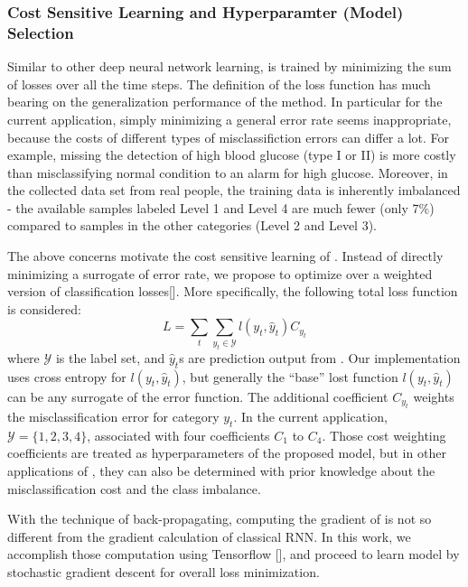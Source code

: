 \subsubsection{Cost Sensitive Learning and Hyperparamter (Model) Selection}
Similar to other deep neural network learning, \modelname is trained by minimizing the sum of losses over all the time steps.
The definition of the loss function has much bearing on the generalization performance of the method.
In particular for the current application, simply minimizing a general error rate seems inappropriate, because the costs of different types of misclassifiction errors can differ a lot.
For example, missing the detection of high blood glucose (type I or II) is more costly than misclassifying normal condition to an alarm for high glucose.
Moreover, in the collected data set from real people, the training data is inherently imbalanced - the available samples labeled Level 1 and Level 4 are much fewer (only 7\%) compared to samples in the other categories (Level 2 and Level 3).

The above concerns motivate the cost sensitive learning of \modelname.
Instead of directly minimizing a surrogate of error rate, we propose to optimize over a weighted version of classification losses[].
More specifically, the following total loss function is considered:
\begin{equation}
L = \sum_{t} \sum_{y_t \in \mathcal{Y}} l(y_t,\hat{y}_t)C_{y_t}
\end{equation}
where $\mathcal{Y}$ is the label set, and $\hat{y}_t$s are prediction output from \modelname.
Our implementation uses cross entropy for $l(y_t,\hat{y}_t)$, but generally the ``base'' lost function $l(y_t,\hat{y}_t)$ can be any surrogate of the error function.
The additional coefficient $C_{y_t}$ weights the misclassification error for category $y_t$.
In the current application, $\mathcal{Y} = \{1,2,3,4\}$, associated with four coefficients $C_1$ to $C_4$.
Those cost weighting coefficients are treated as hyperparameters of the proposed model, but in other applications of \modelname, they can also be determined with prior knowledge about the misclassification cost and the class imbalance.

With the technique of back-propagating, computing the gradient of \modelname is not so different from the gradient calculation of classical RNN.
In this work, we accomplish those computation using Tensorflow [], and proceed to learn \modelname model by stochastic gradient descent for overall loss minimization.

